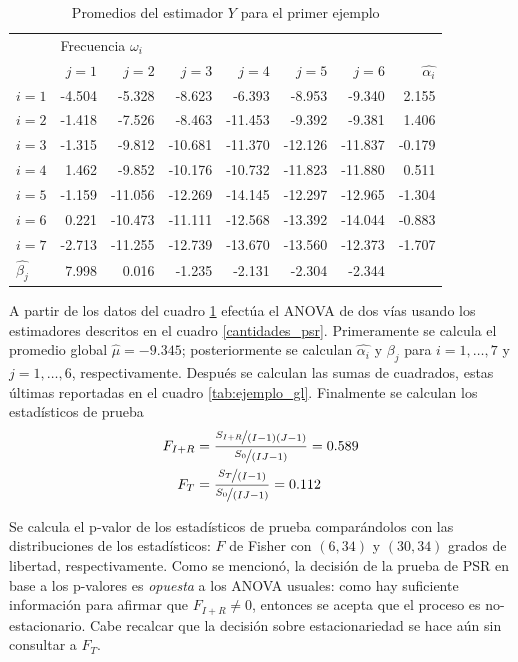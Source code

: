 \documentclass[12pt,letterpaper]{book}
\begin{document}
\begin{table}
\label{tab:valores_psr}
\caption{Promedios del estimador $Y$ para el primer ejemplo}
\centering
\begin{tabular}{lrrrrrrr}
\toprule
      & \multicolumn{6}{l}{Frecuencia $\omega_i$} \\
\cmidrule{2-7}
      & $j=1$  & $j=2$   & $j=3$   & $j=4$   & $j=5$   & $j=6$   & $\widehat{\alpha_i}$ \\ 
\midrule
$i=1$ & -4.504 & -5.328  & -8.623  & -6.393  & -8.953  & -9.340  & 2.155  \\
$i=2$ & -1.418 & -7.526  & -8.463  & -11.453 & -9.392  & -9.381  & 1.406  \\
$i=3$ & -1.315 & -9.812  & -10.681 & -11.370 & -12.126 & -11.837 & -0.179 \\
$i=4$ & 1.462  & -9.852  & -10.176 & -10.732 & -11.823 & -11.880 & 0.511  \\
$i=5$ & -1.159 & -11.056 & -12.269 & -14.145 & -12.297 & -12.965 & -1.304 \\
$i=6$ & 0.221  & -10.473 & -11.111 & -12.568 & -13.392 & -14.044 & -0.883 \\
$i=7$ & -2.713 & -11.255 & -12.739 & -13.670 & -13.560 & -12.373 & -1.707 \\
$\widehat{\beta_j}$
      & 7.998  & 0.016   & -1.235  & -2.131  & -2.304  & -2.344  &         \\ 
\bottomrule
\end{tabular}
\end{table}

A partir de los datos del cuadro \ref{tab:valores_psr} efectúa el ANOVA de dos vías usando los estimadores descritos en el cuadro \ref{cantidades_psr}.
%
Primeramente se calcula el promedio global $\widehat{\mu} = -9.345$; posteriormente se calculan $\widehat{\alpha_i}$ y $\beta_j$ para $i=1,\dots, 7$ y $j=1,\dots, 6$, respectivamente. 
%
Después se calculan las sumas de cuadrados, estas últimas reportadas en el cuadro \ref{tab:ejemplo_gl}.
%
Finalmente se calculan los estadísticos de prueba
\begin{align}
F_{I+R} &= \frac{\nicefrac{S_{I+R}}{(I-1)(J-1)}}{\nicefrac{S_0}{(IJ-1)}} = 0.589 \\
F_{T} &= \frac{\nicefrac{S_{T}}{(I-1)}}{\nicefrac{S_0}{(IJ-1)}} = 0.112
\end{align}

Se calcula el p-valor de los estadísticos de prueba comparándolos con las distribuciones de los estadísticos: $F$ de Fisher con $(6,34)$ y $(30,34)$ grados de libertad, respectivamente.
%
Como se mencionó, la decisión de la prueba de PSR en base a los p-valores es \textit{opuesta} a los ANOVA usuales: como hay suficiente información para afirmar que $F_{I+R} \neq 0$, entonces se acepta que el proceso es no-estacionario.
%
Cabe recalcar que la decisión sobre estacionariedad se hace aún sin consultar a $F_T$.
\end{document}
